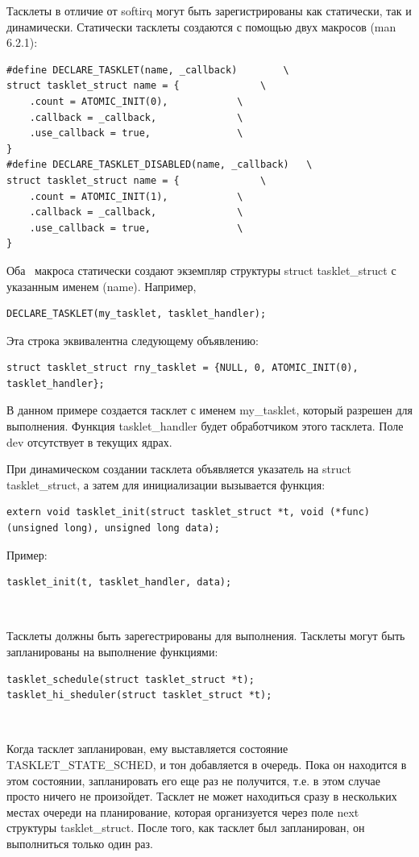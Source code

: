 Тасклеты в отличие от softirq могут быть зарегистрированы как статически, так и динамически. Статически тасклеты создаются с помощью двух макросов (man 6.2.1):

\begin{lstlisting}
#define DECLARE_TASKLET(name, _callback)		\
struct tasklet_struct name = {				\
	.count = ATOMIC_INIT(0),			\
	.callback = _callback,				\
	.use_callback = true,				\
}
#define DECLARE_TASKLET_DISABLED(name, _callback)	\
struct tasklet_struct name = {				\
	.count = ATOMIC_INIT(1),			\
	.callback = _callback,				\
	.use_callback = true,				\
}
\end{lstlisting}

Оба  макроса статически создают экземпляр структуры struct tasklet\_struct с указанным именем (name). Например,

\begin{lstlisting}
DECLARE_TASKLET(my_tasklet, tasklet_handler);
\end{lstlisting}

Эта строка эквивалентна следующему объявлению:
\begin{lstlisting}
struct tasklet_struct rny_tasklet = {NULL, 0, ATOMIC_INIT(0), tasklet_handler};
\end{lstlisting}

В данном примере создается тасклет с именем my\_tasklet, который разрешен для выполнения. Функция tasklet\_handler будет обработчиком этого тасклета. Поле dev отсутствует в текущих ядрах.

При динамическом создании тасклета объявляется указатель на
struct \\ tasklet\_struct, а затем для инициализации вызывается функция:
\begin{lstlisting}
extern void tasklet_init(struct tasklet_struct *t, void (*func)(unsigned long), unsigned long data);
\end{lstlisting}

Пример:
\begin{lstlisting}
tasklet_init(t, tasklet_handler, data);
\end{lstlisting}   

Тасклеты должны быть зарегестрированы для выполнения. Тасклеты могут быть запланированы на выполнение функциями:
\begin{lstlisting}
tasklet_schedule(struct tasklet_struct *t); 
tasklet_hi_sheduler(struct tasklet_struct *t);
\end{lstlisting}  

Когда тасклет запланирован, ему выставляется состояние \\ TASKLET\_STATE\_SCHED, и тон добавляется в очередь. Пока он находится в этом состоянии, запланировать его еще раз не получится, т.е. в этом случае просто ничего не произойдет. Тасклет не может находиться сразу в нескольких местах очереди на планирование, которая организуется через поле next структуры tasklet\_struct. После того, как тасклет был запланирован, он выполниться только один раз.

